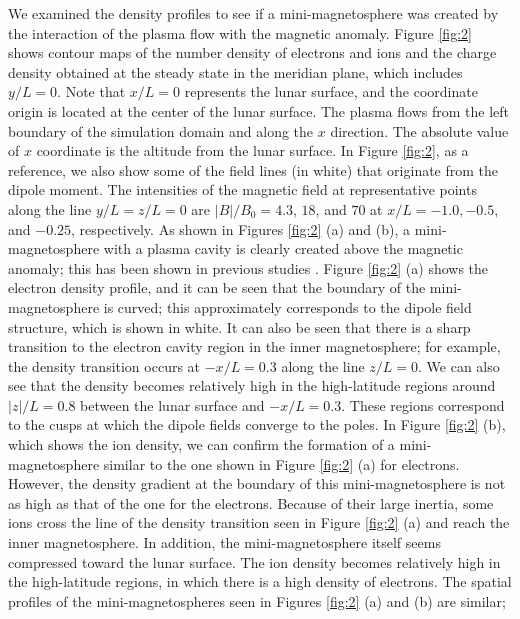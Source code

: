 \documentclass[draft,jgrga]{agutex2015}
\begin{document}
\begin{article}
We examined the density profiles to see 
if a mini-magnetosphere was created by the interaction of
the plasma flow with the magnetic anomaly.
Figure \ref{fig:2} shows contour maps of the number density of electrons and ions  
and the charge density obtained at the steady state 
in the meridian plane, which includes $y/L = 0$. 
Note that $x/L=0$ represents the lunar surface, and 
the coordinate origin is located at the center of the lunar surface.
The plasma flows from the left boundary of 
the simulation domain and along the $x$ direction. 
The absolute value of $x$ coordinate is the altitude from the lunar surface.
In Figure \ref{fig:2}, as a reference,
we also show some of the field lines (in white) that originate from the dipole moment.
The intensities of the magnetic field at representative points along the line $y/L=z/L=0$
are $|B|/B_{\mathrm{0}} = 4.3$, $18$, and $70$ at $x/L=-1.0, -0.5$, and $-0.25$, respectively.
As shown in Figures \ref{fig:2} (a) and (b), 
a mini-magnetosphere with a plasma cavity is clearly 
created above the magnetic anomaly; this has been shown in 
previous studies
\citep[e.g.,][]{Harnett2000,Harnett2003,Halekas2008b,Bamford2012}.
Figure \ref{fig:2} (a) shows the electron density profile, and it can be seen that the boundary of the mini-magnetosphere is curved; this approximately corresponds to the dipole field structure, which is
shown in white.
It can also be seen that there is a sharp transition to 
the electron cavity region in the inner magnetosphere; for example,
the density transition occurs at $-x/L = 0.3$ 
along the line $z/L =0$.
We can also see that the density becomes relatively high 
in the high-latitude regions around
$|z|/L=0.8$ between the lunar surface and $-x/L=0.3$.
These regions correspond to the cusps at which the dipole fields converge to the poles.
In Figure \ref{fig:2} (b), which shows the ion density, 
we can confirm the formation of a mini-magnetosphere similar to the one shown 
in Figure \ref{fig:2} (a) for electrons.
However, 
the density gradient at the boundary of this mini-magnetosphere is 
not as high as that of the one for the electrons.
Because of their large inertia, some ions cross the line of the density transition seen in Figure \ref{fig:2} (a) and 
reach the inner magnetosphere. 
In addition, the mini-magnetosphere itself seems compressed toward the lunar surface.
The ion density becomes relatively high in the high-latitude regions, in which there is a 
high density of electrons. 
The spatial profiles of the mini-magnetospheres seen in Figures \ref{fig:2} (a) and (b) are similar;

\end{article}
\end{document}
